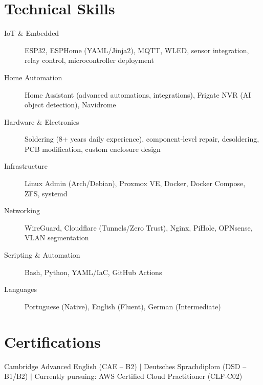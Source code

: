\documentclass[10pt]{article}
\begin{document}
\section{Technical Skills}
\begin{description}
	\item[IoT \& Embedded] ESP32, ESPHome (YAML/Jinja2), MQTT, WLED, sensor integration, relay control, microcontroller deployment
	\item[Home Automation] Home Assistant (advanced automations, integrations), Frigate NVR (AI object detection), Navidrome
	\item[Hardware \& Electronics] Soldering (8+ years daily experience), component-level repair, desoldering, PCB modification, custom enclosure design
	\item[Infrastructure] Linux Admin (Arch/Debian), Proxmox VE, Docker, Docker Compose, ZFS, systemd
	\item[Networking] WireGuard, Cloudflare (Tunnels/Zero Trust), Nginx, PiHole, OPNsense, VLAN segmentation
	\item[Scripting \& Automation] Bash, Python, YAML/IaC, GitHub Actions
	\item[Languages] Portuguese (Native), English (Fluent), German (Intermediate)
\end{description}

\section{Certifications}
Cambridge Advanced English (CAE -- B2) $|$ Deutsches Sprachdiplom (DSD -- B1/B2) $|$ Currently pursuing: AWS Certified Cloud Practitioner (CLF-C02)
\end{document}

